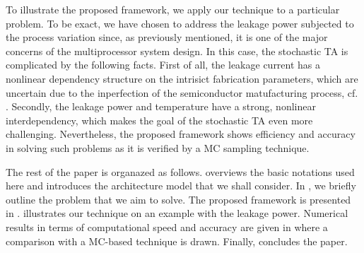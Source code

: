 To illustrate the proposed framework, we apply our technique to a particular problem. To be exact, we have chosen to address the leakage power subjected to the process variation since, as previously mentioned, it is one of the major concerns of the multiprocessor system design. In this case, the stochastic TA is complicated by the following facts. First of all, the leakage current has a nonlinear dependency structure on the intrisict fabrication parameters, which are uncertain due to the inperfection of the semiconductor matufacturing process, cf. \cite{juan2012, srivastava2010}. Secondly, the leakage power and temperature have a strong, nonlinear interdependency, which makes the goal of the stochastic TA even more challenging. Nevertheless, the proposed framework shows efficiency and accuracy in solving such problems as it is verified by a MC sampling technique.

The rest of the paper is organazed as follows.  overviews the basic notations used here and introduces the architecture model that we shall consider. In , we briefly outline the problem that we aim to solve. The proposed framework is presented in .  illustrates our technique on an example with the leakage power. Numerical results in terms of computational speed and accuracy are given in  where a comparison with a MC-based technique is drawn. Finally,  concludes the paper.
